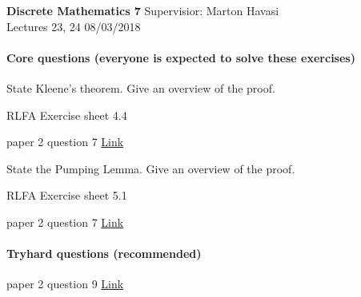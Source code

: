 \documentclass{exam}
\begin{document}
\noindent
\large\textbf{Discrete Mathematics 7} \hfill Supervisior: Marton Havasi \\
\normalsize Lectures 23, 24 \hfill 08/03/2018

\paragraph{Core questions (everyone is expected to solve these exercises)}
\begin{questions}

\question State Kleene's theorem. Give an overview of the proof.

\question RLFA Exercise sheet 4.4

 paper 2 question 7 \href{http://www.cl.cam.ac.uk/teaching/exams/pastpapers/y1999p2q7.pdf}{Link}

\question State the Pumping Lemma. Give an overview of the proof.

\question RLFA Exercise sheet 5.1

 paper 2 question 7 \href{http://www.cl.cam.ac.uk/teaching/exams/pastpapers/y1998p2q7.pdf}{Link}

\end{questions}

\paragraph{Tryhard questions (recommended)}
\begin{questions}

 paper 2 question 9 \href{http://www.cl.cam.ac.uk/teaching/exams/pastpapers/y2004p2q9.pdf}{Link}


\end{questions}
\end{document}
